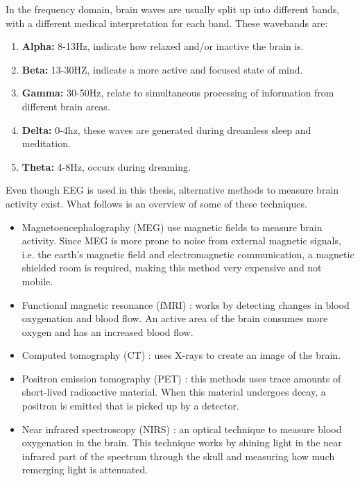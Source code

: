 
In the frequency domain, brain waves are usually split up into different bands\cite{EmotionRelativePower,WavesSite}, with a different medical interpretation for each band. These wavebands \label{wavebands} are:
\begin{enumerate}
\item \textbf{Alpha:} 8-13Hz, indicate how relaxed and/or inactive the brain is.
\item \textbf{Beta:} 13-30HZ, indicate a more active and focused state of mind.
\item \textbf{Gamma:} 30-50Hz, relate to simultaneous processing of information from different brain areas.
\item \textbf{Delta:} 0-4hz, these waves are generated during dreamless sleep and meditation.
\item \textbf{Theta:} 4-8Hz, occurs during dreaming.
\end{enumerate}

\npar

Even though EEG is used in this thesis, alternative methods to measure brain activity exist. What follows is an overview of some of these techniques.
\begin{itemize}

\item Magnetoencephalography (MEG) use magnetic fields to measure brain activity\citep{meg}. Since MEG is more prone to noise from external magnetic signals, i.e. the earth's magnetic field and electromagnetic communication, a magnetic shielded room is required, making this method very expensive and not mobile.

\item Functional magnetic resonance (fMRI) \citep{fMRI}: works by detecting changes in blood oxygenation and blood flow. An active area of the brain consumes more oxygen and has an increased blood flow.

\item Computed tomography (CT) \citep{CT}: uses X-rays to create an image of the brain. 

\item Positron emission tomography (PET) \citep{PET}: this methods uses trace amounts of short-lived radioactive material. When this material undergoes decay, a positron is emitted that is picked up by a detector.

\item Near infrared spectroscopy (NIRS) \citep{NIRS}: an optical technique to measure blood oxygenation in the brain. This technique works by shining light in the near infrared part of the spectrum through the skull and measuring how much remerging light is attenuated.

\end{itemize} 

